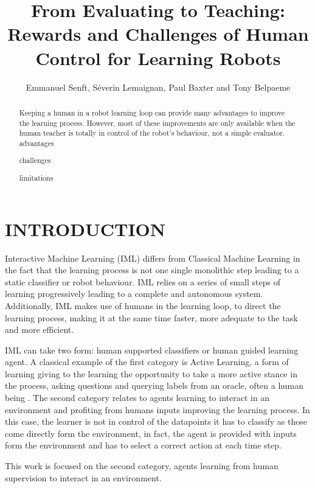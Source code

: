 \documentclass[letterpaper, 10 pt, conference]{ieeeconf}  %
\title{\LARGE \bf
From Evaluating to Teaching:\\
Rewards and Challenges of Human Control for Learning Robots
}
\author{Emmanuel Senft, S\'{e}verin Lemaignan, Paul Baxter and Tony Belpaeme%
}
\begin{document}
\maketitle
\thispagestyle{empty}
\pagestyle{empty}


\begin{abstract}
Keeping a human in a robot learning loop can provide many advantages to improve the learning process. However, most of these improvements are only available when the human teacher is totally in control of the robot's behaviour, not a simple evaluator. 
advantages

challenges

limitations

\end{abstract}


\section{INTRODUCTION}

Interactive Machine Learning (IML) \cite{fails2003interactive,amershi2014power} differs from Classical Machine Learning in the fact that the learning process is not one single monolithic step leading to a static classifier or robot behaviour. IML relies on a series of small steps of learning progressively leading to a complete and autonomous system. Additionally, IML makes use of humans in the learning loop, to direct the learning process, making it at the same time faster, more adequate to the task and more efficient.

IML can take two form: human supported classifiers or human guided learning agent. A classical example of the first category is Active Learning, a form of learning giving to the learning the opportunity to take a more active stance in the process, asking questions and querying labels from an oracle, often a human being \cite{settles2012active}. The second category relates to agents learning to interact in an environment and profiting from humans inputs improving the learning process. In this case, the learner is not in control of the datapoints it has to classify as those come directly form the environment, in fact, the agent is provided with inputs form the environment and has to select a correct action at each time step.

This work is focused on the second category, agents learning from human supervision to interact in an environment. 
\end{document}
